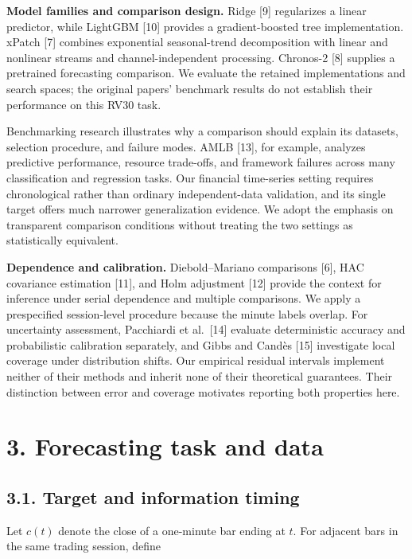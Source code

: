 \textbf{Model families and comparison design.} Ridge {[}9{]} regularizes
a linear predictor, while LightGBM {[}10{]} provides a gradient-boosted
tree implementation. xPatch {[}7{]} combines exponential seasonal-trend
decomposition with linear and nonlinear streams and channel-independent
processing. Chronos-2 {[}8{]} supplies a pretrained forecasting
comparison. We evaluate the retained implementations and search spaces;
the original papers' benchmark results do not establish their
performance on this RV30 task.

Benchmarking research illustrates why a comparison should explain its
datasets, selection procedure, and failure modes. AMLB {[}13{]}, for
example, analyzes predictive performance, resource trade-offs, and
framework failures across many classification and regression tasks. Our
financial time-series setting requires chronological rather than
ordinary independent-data validation, and its single target offers much
narrower generalization evidence. We adopt the emphasis on transparent
comparison conditions without treating the two settings as statistically
equivalent.

\textbf{Dependence and calibration.} Diebold--Mariano comparisons
{[}6{]}, HAC covariance estimation {[}11{]}, and Holm adjustment
{[}12{]} provide the context for inference under serial dependence and
multiple comparisons. We apply a prespecified session-level procedure
because the minute labels overlap. For uncertainty assessment,
Pacchiardi et al.~{[}14{]} evaluate deterministic accuracy and
probabilistic calibration separately, and Gibbs and Candès {[}15{]}
investigate local coverage under distribution shifts. Our empirical
residual intervals implement neither of their methods and inherit none
of their theoretical guarantees. Their distinction between error and
coverage motivates reporting both properties here.

\section{3. Forecasting task and data}\label{forecasting-task-and-data}

\subsection{3.1. Target and information
timing}\label{target-and-information-timing}

Let \(c(t)\) denote the close of a one-minute bar ending at \(t\). For
adjacent bars in the same trading session, define

